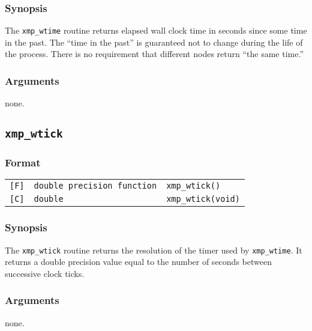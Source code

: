 \subsubsection*{Synopsis}
    The {\tt xmp\_wtime} routine returns elapsed wall clock time in seconds 
    since some time in the past. The ``time in the past'' is guaranteed
    not to change during the life of the process.
    There is no requirement that different nodes return ``the same time.''

\subsubsection*{Arguments}
    none.


\subsection{\tt xmp\_wtick}

\subsubsection*{Format}

\begin{tabular}{lll}

\verb![F]!&  {\tt double precision function}& {\tt xmp\_wtick()}\\

\verb![C]!&  {\tt double}& {\tt xmp\_wtick(void)}

\end{tabular}

\subsubsection*{Synopsis}
    The {\tt xmp\_wtick} routine returns the resolution of the timer
    used by {\tt xmp\_wtime}. 
    It returns a double precision value equal to the number of seconds 
    between successive clock ticks.

\subsubsection*{Arguments}
    none.


